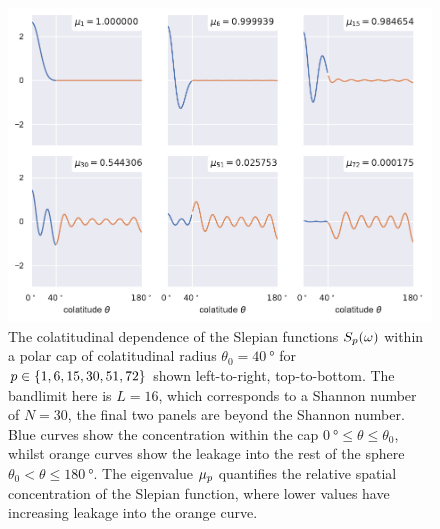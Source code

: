 \begin{figure}[htpb]
	\centering\capstart{}
	\includegraphics[width=\textwidth]{slepian_colatitude.pdf}
	\caption[
		The colatitudinal dependence of the polar cap Slepian functions
	]{
		The colatitudinal dependence of the Slepian functions \({S}_{p}(\omega)\) within a polar cap of colatitudinal radius \(\theta_{0}=\SI{40}{\degree}\) for \(p \in \{1, 6, 15, 30, 51, 72\}\) shown left-to-right, top-to-bottom.
		The bandlimit here is  \(L=16\), which corresponds to a Shannon number of \(N=30\), \ie{} the final two panels are beyond the Shannon number.
		Blue curves show the concentration within the cap \(\SI{0}{\degree} \leq \theta \leq \theta_{0}\), whilst orange curves show the leakage into the rest of the sphere \(\theta_{0} < \theta \leq \SI{180}{\degree}\).
		The eigenvalue \({\mu}_{p}\) quantifies the relative spatial concentration of the Slepian function, where lower values have increasing leakage into the orange curve.
	}\label{fig:chapter2_slepian_colatitude}
\end{figure}
